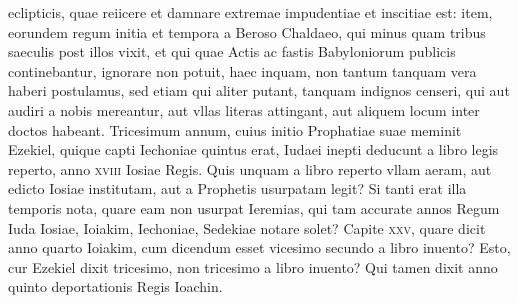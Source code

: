 eclipticis, quae reiicere et damnare extremae impudentiae et
inscitiae est: item, eorundem regum initia et tempora a Beroso Chaldaeo,
qui minus quam tribus saeculis post illos vixit, et qui quae Actis
ac fastis Babyloniorum publicis continebantur, ignorare non potuit,
haec inquam, non tantum tanquam vera haberi postulamus, sed etiam
qui aliter putant, tanquam indignos censeri, qui aut audiri a nobis
mereantur, aut vllas literas attingant, aut aliquem locum inter
doctos habeant.
Tricesimum annum, cuius initio Prophatiae suae
meminit Ezekiel, quique capti Iechoniae quintus erat, Iudaei inepti
deducunt a libro legis reperto, anno \textsc{xviii} Iosiae Regis.
Quis unquam a libro reperto vllam aeram, aut edicto
 Iosiae institutam, aut a
Prophetis usurpatam legit?
Si tanti erat illa temporis nota, quare
eam non usurpat Ieremias, qui tam accurate annos Regum Iuda Iosiae,
Ioiakim, Iechoniae, Sedekiae notare solet?
Capite \textsc{xxv}, quare dicit
anno quarto Ioiakim, cum dicendum esset vicesimo secundo a libro
inuento?
Esto, cur Ezekiel dixit tricesimo, non tricesimo a libro inuento?
Qui tamen dixit anno quinto deportationis Regis Ioachin.

